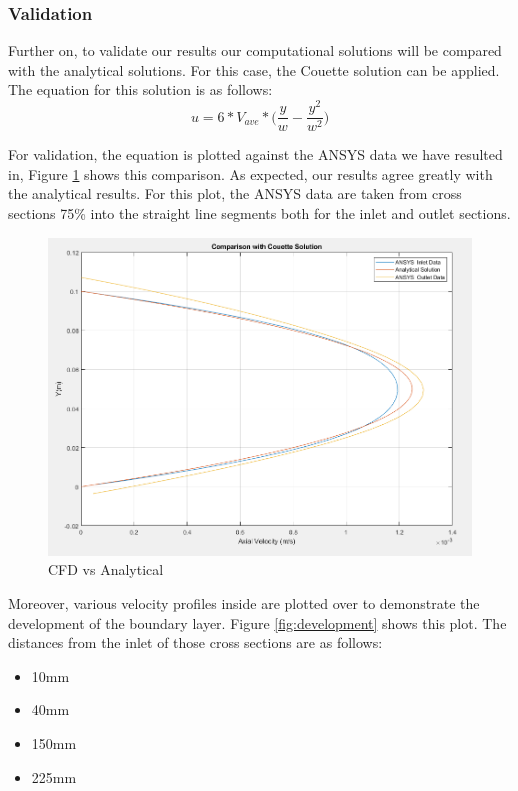 \subsubsection{Validation}
Further on, to validate our results our computational solutions will be compared with the analytical solutions. For this case, the Couette solution can be applied. The equation for this solution is as follows:
\begin{equation}
    u = 6 * V_{ave} * \Big( \frac{y}{w} - \frac{y^2}{w^2}\Big)
\end{equation}


For validation, the equation is plotted against the ANSYS data we have resulted in, Figure \ref{fig:couette} shows this comparison. As expected, our results agree greatly with the analytical results. For this plot, the ANSYS data are taken from cross sections 75\% into the straight line segments both for the inlet and outlet sections.

\begin{figure}[H]
    \centering
    \includegraphics[width=.7\textwidth]{images/task1/couette.png}
    \caption{CFD vs Analytical}
    \label{fig:couette}
\end{figure}


Moreover, various velocity profiles inside are plotted over to demonstrate the development of the boundary layer. Figure \ref{fig:development} shows this plot. The distances from the inlet of those cross sections are as follows:
\begin{itemize}
    \item 10mm
    \item 40mm
    \item 150mm
    \item 225mm
\end{itemize}



